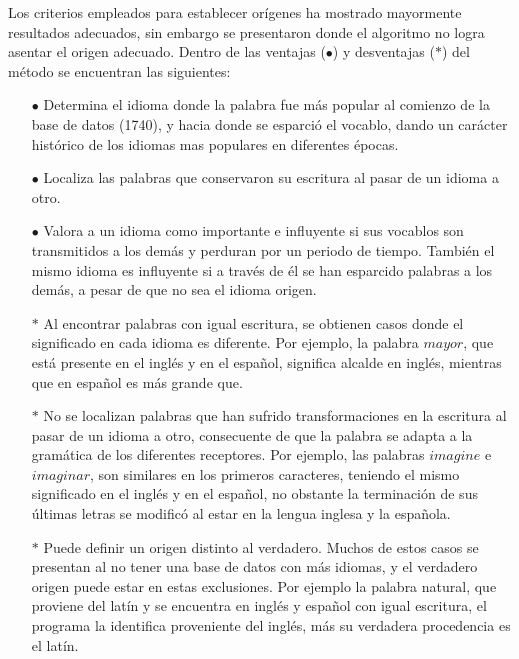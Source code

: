 
Los criterios empleados para establecer orígenes ha mostrado mayormente resultados adecuados, sin embargo se presentaron donde el algoritmo no logra asentar el origen adecuado. Dentro de las ventajas ($\bullet$) y desventajas ($\ast$) del método se encuentran las siguientes:

\begin{itemize}
\item [$\bullet$] 
Determina el idioma donde la palabra fue más popular al comienzo de
la base de datos (1740), y hacia donde se esparció el vocablo, dando un
carácter histórico de los idiomas mas populares en diferentes épocas. 

\item [$\bullet$] 
Localiza las palabras que conservaron su escritura al pasar de un
idioma a otro. 

\item [$\bullet$] 
Valora a un idioma como importante e influyente si sus vocablos son
transmitidos a los demás y perduran por un periodo de tiempo. También el mismo
idioma es influyente si a través de él se han esparcido palabras a los demás, a
pesar de que no sea el idioma origen. 

\item [$\ast$] Al encontrar palabras con igual escritura, se obtienen casos donde
el significado en cada idioma es diferente.  Por ejemplo, la palabra
$\textit{mayor}$, que está presente en el inglés y en el español,  significa
alcalde en inglés, mientras que en español es más grande que.

\item [$\ast$]
No se localizan palabras que han sufrido transformaciones en la
escritura al pasar de un idioma a otro, consecuente de que la palabra se adapta
a la gramática de los diferentes receptores.  Por ejemplo, las palabras
$\textit{imagine}$ e $\textit{imaginar}$, son similares en los primeros
caracteres, teniendo el mismo significado en el inglés y en el español, no
obstante la terminación de  sus últimas letras se modificó al estar en  la
lengua inglesa y la española. 

\item [$\ast$]
 Puede definir un origen distinto al verdadero.  Muchos de estos casos se
presentan al no tener una base de datos con más idiomas, y el verdadero origen
puede estar en estas exclusiones. Por ejemplo la palabra natural, que proviene
del latín y se encuentra en inglés y español con igual escritura,  el programa
la identifica proveniente del inglés, más su verdadera procedencia es el latín. 

\end{itemize}


